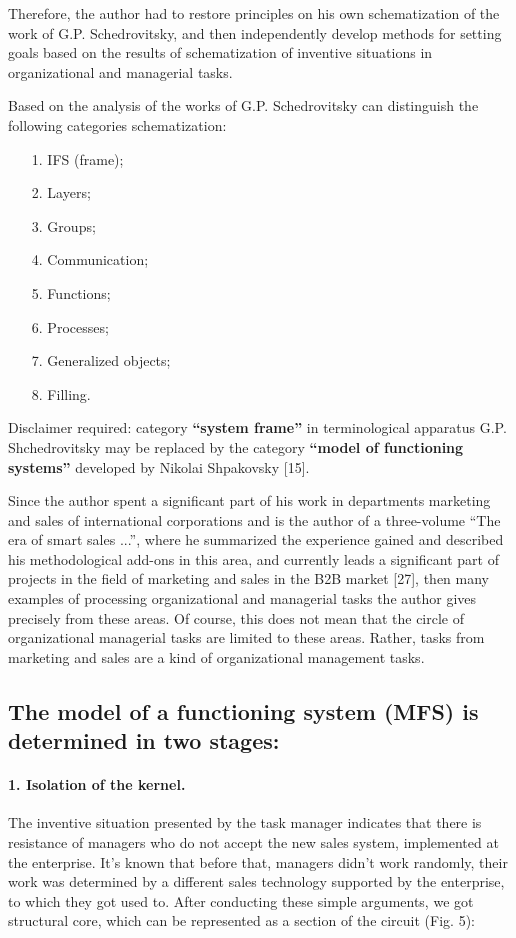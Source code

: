 Therefore, the author had to restore principles on his own schematization of
the work of G.P. Schedrovitsky, and then independently develop methods for
setting goals based on the results of schematization of inventive situations
in organizational and managerial tasks.

Based on the analysis of the works of G.P. Schedrovitsky can distinguish the
following categories schematization:
\begin{itemize}\itemsep0pt
\item[1.] IFS (frame);
\item[2.] Layers;
\item[3.] Groups;
\item[4.] Communication;
\item[5.] Functions;
\item[6.] Processes;
\item[7.] Generalized objects;
\item[8.] Filling.
\end{itemize}

Disclaimer required: category \textbf{“system frame”} in terminological
apparatus G.P. Shchedrovitsky may be replaced by the category \textbf{“model
  of functioning systems”} developed by Nikolai Shpakovsky [15].

Since the author spent a significant part of his work in departments marketing
and sales of international corporations and is the author of a three-volume
“The era of smart sales ...”, where he summarized the experience gained and
described his methodological add-ons in this area, and currently leads a
significant part of projects in the field of marketing and sales in the B2B
market [27], then many examples of processing organizational and managerial
tasks the author gives precisely from these areas. Of course, this does not
mean that the circle of organizational managerial tasks are limited to these
areas. Rather, tasks from marketing and sales are a kind of organizational
management tasks.

\subsection*{The model of a functioning system (MFS) is determined in two
  stages:}

\paragraph{1. Isolation of the kernel.}
The inventive situation presented by the task manager indicates that there is
resistance of managers who do not accept the new sales system, implemented at
the enterprise. It’s known that before that, managers didn’t work randomly,
their work was determined by a different sales technology supported by the
enterprise, to which they got used to. After conducting these simple
arguments, we got structural core, which can be represented as a section of
the circuit (Fig. 5):

